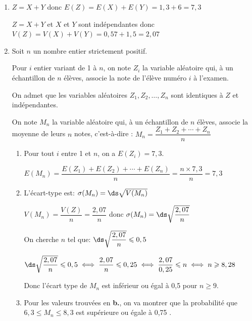 \begin{enumerate}
\item %
$Z=X+Y$ donc $E(Z)=E(X)+E(Y)= 1,3+6=7,3$

$Z=X+Y$ et $X$ et $Y$ sont indépendantes donc $V(Z)=V(X)+V(Y)=0,57+1,5=2,07$

\item Soit $n$ un nombre entier strictement positif.

Pour $i$ entier variant de 1 à $n$, on note $Z_{i}$ la variable aléatoire qui, à un échantillon de $n$ élèves, associe la note de l'élève numéro $i$ à l'examen.

On admet que les variables aléatoires $Z_{1}, Z_{2}, \ldots, Z_{n}$ sont identiques à $Z$ et indépendantes.

On note $M_{n}$ la variable aléatoire qui, à un échantillon de $n$ élèves, associe la moyenne de leurs $n$ notes, c'est-à-dire :
$M_{n} = \dfrac{Z_{1} + Z_{2} + \cdots + Z_{n}}{n}$

	\begin{enumerate}
		\item %
Pour tout $i$ entre 1 et $n$, on a $E(Z_i)= 7,3$.

$E(M_n)=\dfrac{E(Z_{1}) + E(Z_{2}) + \cdots + E(Z_{n})}{n}
=\dfrac{n\times 7,3}{n} = 7,3$
		

		\item %
L'écart-type est: $\sigma(M_n) = \ds\sqrt{V(M_n)}$

$V(M_n)=\dfrac{V(Z)}{n}=\dfrac{2,07}{n}$ donc $\sigma(M_n) = \ds\sqrt{ \dfrac{2,07}{n}}$

On cherche $n$ tel que: $\ds\sqrt{ \dfrac{2,07}{n}}\leqslant 0,5$

$\ds\sqrt{ \dfrac{2,07}{n}}\leqslant 0,5
\iff \dfrac{2,07}{n} \leqslant 0,25
\iff \dfrac{2,07}{0,25}\leqslant n
\iff n\geqslant 8,28$

Donc l'écart type de $M_{n}$ est inférieur ou égal à 0,5 pour $n\geqslant 9$.

		\item Pour les valeurs trouvées en \textbf{b.}, on va montrer que la probabilité que\\
		 $6,3 \leqslant M_{n} \leqslant 8,3$ est supérieure ou égale à 0,75 .

\end{enumerate}
\end{enumerate}

